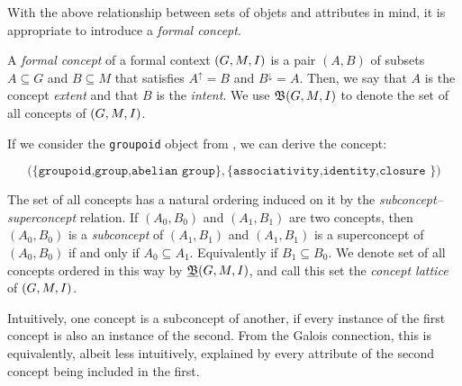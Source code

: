 With the above relationship between sets of objets and attributes in mind, it is appropriate to introduce a \textit{formal concept}.

\begin{definition}
  \label{definition:formal-concept}  A \textit{formal concept} of a formal context $(G,M,\mathrel{I})$ is a pair $(A,B)$ of subsets $A \subseteq G$ and $B \subseteq M$
  that satisfies $A^{\uparrow}= B$ and $B^{\downarrow}= A$. Then, we say that $A$ is the concept \textit{extent} and that $B$ is the \textit{intent}. We use ${\mathfrak B} (G,M,\mathrel{I})$ to denote the set
  of all concepts of $(G,M,\mathrel{I})$.
\end{definition}

\begin{example}
  \label{example:formal-concept} If we consider the \texttt{groupoid} object from , we can derive the concept:

  \[
    \big(\{\texttt{groupoid,group,abelian group}\}, \{\texttt{associativity,identity,closure }\} \big)
  \]


\end{example}

The set of all concepts has a natural ordering induced on it by the \textit{subconcept--superconcept} relation. If $(A_{0},B_{0})$ and $(A_{1},B_{1})$ are two concepts, then
$(A_{0},B_{0})$ is a \textit{subconcept} of $(A_{1}, B_{1})$ and $(A_{1}, B_{1})$ is a superconcept of $(A_{0},B_{0})$ if and only if $A_{0}\subseteq A_{1}$. Equivalently if
$B_{1}\subseteq B_{0}$. We denote set of all concepts ordered in this way by $\underline{{\mathfrak B}} (G,M,\mathrel{I})$, and call this set the \textit{concept lattice} of $(G,M,\mathrel{I})$.

Intuitively, one concept is a subconcept of another, if every instance of the first concept is also an instance of the second. From the Galois connection, this is equivalently,
albeit less intuitively, explained by every attribute of the second concept being included in the first.

